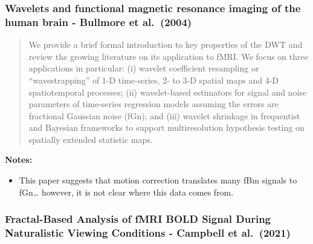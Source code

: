 \documentclass[
  sn-vancouver,
  Numbered,
  referee,
  lineno]{sn-jnl}
\providecommand{\tightlist}{%
  \setlength{\itemsep}{0pt}\setlength{\parskip}{0pt}}\usepackage{longtable,booktabs,array}
\begin{document}
\subsubsection{\texorpdfstring{Wavelets and functional magnetic
resonance imaging of the human brain - Bullmore et al.~(2004)
\citep{bullmoreWaveletsFunctionalMagnetic2004}}{Wavelets and functional magnetic resonance imaging of the human brain - Bullmore et al.~(2004) {[}@bullmoreWaveletsFunctionalMagnetic2004{]}}}\label{wavelets-and-functional-magnetic-resonance-imaging-of-the-human-brain---bullmore-et-al.-2004-bullmorewaveletsfunctionalmagnetic2004}

\begin{quote}
We provide a brief formal introduction to key properties of the DWT and
review the growing literature on its application to fMRI. We focus on
three applications in particular: (i) wavelet coefficient resampling or
``wavestrapping'' of 1-D time-series, 2- to 3-D spatial maps and 4-D
spatiotemporal processes; (ii) wavelet-based estimators for signal and
noise parameters of time-series regression models assuming the errors
are fractional Gaussian noise (fGn); and (iii) wavelet shrinkage in
frequentist and Bayesian frameworks to support multiresolution
hypothesis testing on spatially extended statistic maps.
\end{quote}

\textbf{Notes:}

\begin{itemize}
\tightlist
\item
  This paper suggests that motion correction translates many fBm signals
  to fGn\ldots{} however, it is not clear where this data comes from.
\end{itemize}

\subsubsection{\texorpdfstring{Fractal-Based Analysis of fMRI BOLD
Signal During Naturalistic Viewing Conditions - Campbell et al.~(2021)
\citep{campbellFractalBasedAnalysisFMRI2022}}{Fractal-Based Analysis of fMRI BOLD Signal During Naturalistic Viewing Conditions - Campbell et al.~(2021) {[}@campbellFractalBasedAnalysisFMRI2022{]}}}\label{fractal-based-analysis-of-fmri-bold-signal-during-naturalistic-viewing-conditions---campbell-et-al.-2021-campbellfractalbasedanalysisfmri2022}
\end{document}
